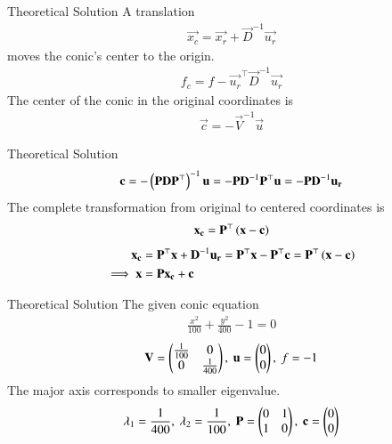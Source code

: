 \documentclass{beamer}
\begin{document}
\begin{frame}{Theoretical Solution}
A translation 
\begin{align}
    \vec{x_c} = \vec{x_r} + \vec{D}^{-1}\vec{u_r}
\end{align}
moves the conic's center to the origin.
\begin{align}
    f_c = f - \vec{u_r}^\top\vec{D}^{-1}\vec{u_r}
\end{align}
The center of the conic in the original coordinates is 
\begin{align}
    \vec{c} = -\vec{V}^{-1}\vec{u}
\end{align}
\end{frame}

\begin{frame}{Theoretical Solution}
\begin{align}
    \mathbf{c} = -\left(\mathbf{P}\mathbf{D}\mathbf{P}^\top\right)^{-1}\mathbf{u} = -\mathbf{P}\mathbf{D}^{-1}\mathbf{P}^\top\mathbf{u} = -\mathbf{P}\mathbf{D}^{-1}\mathbf{u_r}
\end{align}
The complete transformation from original to centered coordinates is 
\begin{align}
    \mathbf{x_c} = \mathbf{P}^\top\left(\mathbf{x}-\mathbf{c}\right)
\end{align}
\begin{align}
    \mathbf{x_c} &= \mathbf{P}^\top\mathbf{x} + \mathbf{D}^{-1}\mathbf{u_r} = \mathbf{P}^\top\mathbf{x} - \mathbf{P}^\top\mathbf{c} = \mathbf{P}^\top\left(\mathbf{x}-\mathbf{c}\right) \\
    \implies \mathbf{x} &= \mathbf{P}\mathbf{x_c} + \mathbf{c} \label{eq:71}
\end{align}
\end{frame}

\begin{frame}{Theoretical Solution}
The given conic equation
\begin{align}
    \frac{x^2}{100} + \frac{y^2}{400} - 1 = 0
\end{align}
\begin{align}
    \mathbf{V} = \begin{pmatrix}\frac{1}{100} & 0 \\ 0 & \frac{1}{400}\end{pmatrix}, \text{ } \mathbf{u} = \begin{pmatrix}0 \\ 0\end{pmatrix}, \text{ } f = -1
\end{align}
The major axis corresponds to smaller eigenvalue.
\begin{align}
    \lambda_1 = \frac{1}{400}, \text{ } \lambda_2 = \frac{1}{100}, \text{ } \mathbf{P} = \begin{pmatrix}0 & 1 \\ 1 & 0\end{pmatrix}, \text{ } \mathbf{c} = \begin{pmatrix}0 \\ 0\end{pmatrix}
\end{align}
\end{frame}
\end{document}
